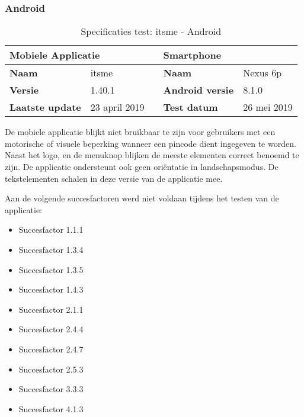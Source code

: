 \subsubsection{Android}
\begin{table} [H]
    \centering
    \caption{Specificaties test: itsme - Android}
    \begin{tabular}{|l|l|l|l|l|} 
        \hline
        \multicolumn{2}{|l|}{\textbf{Mobiele Applicatie } } &  & \multicolumn{2}{l|}{\textbf{Smartphone }}  \\ 
        \hline
        \textbf{Naam}           & itsme                   &  & \textbf{Naam}           & Nexus 6p         \\ 
        \hline
        \textbf{Versie}         & 1.40.1                     &  & \textbf{Android versie} & 8.1.0            \\ 
        \hline
        \textbf{Laatste update} & 23 april 2019               &  & \textbf{Test datum}     & 26 mei 2019      \\
        \hline
    \end{tabular}
\end{table}

De mobiele applicatie blijkt niet bruikbaar te zijn voor gebruikers met een motorische of visuele beperking wanneer een pincode dient ingegeven te worden. Naast het logo, en de menuknop blijken de meeste elementen correct benoemd te zijn. De applicatie ondersteunt ook geen oriëntatie in landschapsmodus. De tekstelementen schalen in deze versie van de applicatie mee.

 Aan de volgende succesfactoren werd niet voldaan tijdens het testen van de applicatie: \begin{itemize}
     \item Succesfactor 1.1.1
          \item Succesfactor 1.3.4
               \item Succesfactor 1.3.5
                    \item Succesfactor 1.4.3
                         \item Succesfactor 2.1.1
                              \item Succesfactor 2.4.4
                                   \item Succesfactor 2.4.7
                                        \item Succesfactor 2.5.3
                                             \item Succesfactor 3.3.3
                                                  \item Succesfactor 4.1.3
 \end{itemize}

